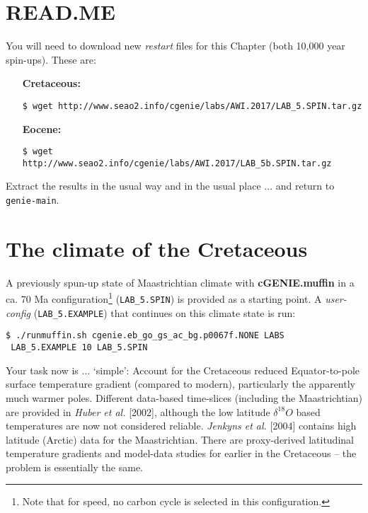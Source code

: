 \documentclass[11pt,fleqn]{book} %
\begin{document}

\newpage


\section*{READ.ME}

You will need to download new \textit{restart} files for this Chapter (both 10,000 year spin-ups). These are:

\vspace{2mm}
\begin{enumerate}[noitemsep]
\item[\textbf{Cretaceous:}]
\begin{verbatim}
$ wget http://www.seao2.info/cgenie/labs/AWI.2017/LAB_5.SPIN.tar.gz
\end{verbatim}
\item[\textbf{Eocene:}]
\begin{verbatim}
$ wget http://www.seao2.info/cgenie/labs/AWI.2017/LAB_5b.SPIN.tar.gz
\end{verbatim}
\end{enumerate}
\vspace{2mm}

Extract the results in the usual way and in the usual place ... and return to \texttt{genie-main}.


\newpage


\section{The climate of the Cretaceous}

A previously spun-up state of Maastrichtian climate with \textbf{cGENIE.muffin} in a ca. 70 Ma configuration\footnote{Note that for speed, no carbon cycle is selected in this configuration.} (\texttt{LAB\_5.SPIN}) is provided as a starting point. A \textit{user-config} (\texttt{LAB\_5.EXAMPLE}) that continues on this climate state is run:
\begin{verbatim}
$ ./runmuffin.sh cgenie.eb_go_gs_ac_bg.p0067f.NONE LABS
 LAB_5.EXAMPLE 10 LAB_5.SPIN
\end{verbatim}

Your task now is ... ‘simple’: Account for the Cretaceous reduced Equator-to-pole surface temperature gradient (compared to modern), particularly the apparently much warmer poles. Different data-based time-slices (including the Maastrichtian) are provided in \textit{Huber et al.} [2002], although the low latitude \(\delta^{18}O\) based temperatures are now not considered reliable. \textit{Jenkyns et al.} [2004] contains high latitude (Arctic) data for the Maastrichtian. There are proxy-derived latitudinal temperature gradients and model-data studies for earlier in the Cretaceous – the problem is essentially the same.
\end{document}
